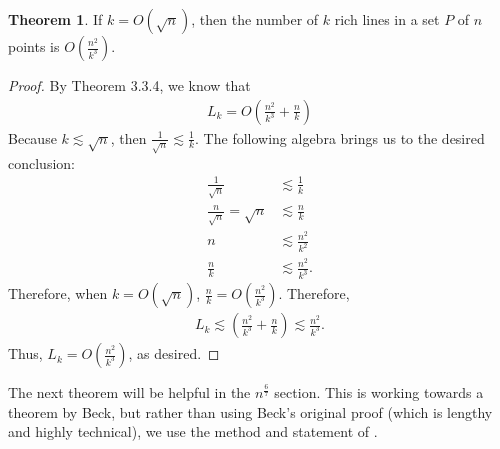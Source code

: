 \documentclass{scrippsthesisclass}
\theoremstyle{definition}
\newtheorem{theorem}{Theorem}[section]
\begin{document}
\begin{theorem}
    If $k = O(\sqrt{n})$, then the number of $k$ rich lines in a set $P$ of $n$ points is $O\left(\frac{n^2}{k^3}\right)$.
\end{theorem}
\begin{proof}
    By Theorem 3.3.4, we know that 
    \begin{align}
    L_k = O\left(\frac{n^2}{k^3} + \frac{n}{k} \right)
    \end{align}
    Because $k \lesssim \sqrt{n}$, then $\frac{1}{\sqrt{n}} \lesssim \frac{1}{k}$. 
    The following algebra brings us to the desired conclusion:
    \begin{align}
        \frac{1}{\sqrt{n}} &\lesssim \frac{1}{k}\\
        \frac{n}{\sqrt{n}} = \sqrt{n} & \lesssim \frac{n}{k}\\
        n &\lesssim \frac{n^2}{k^2}\\
        \frac{n}{k} &\lesssim \frac{n^2}{k^3}.
    \end{align}
    Therefore, when $k = O(\sqrt{n})$, $\frac{n}{k} = O\left(\frac{n^2}{k^3}\right)$. 
    Therefore, 
    \begin{align}
        L_k \lesssim \left(\frac{n^2}{k^3} + \frac{n}{k} \right) \lesssim \frac{n^2}{k^3}.
    \end{align}
    Thus, $L_k = O\left(\frac{n^2}{k^3}\right)$, as desired.
\end{proof}

The next theorem will be helpful in the $n^{\frac{6}{7}}$ section. 
This is working towards a theorem by Beck, but rather than using Beck's original proof (which is lengthy and highly technical), we use the method and statement of \cite{Solymosi2}. 
\end{document}

